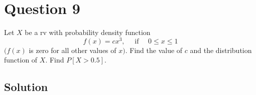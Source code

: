 \section*{Question 9}

Let \( X \) be a rv with probability density function
\begin{equation*}
    f(x)=c x^{3}, \quad \text { if } \quad 0 \leq x \leq 1
\end{equation*}
\( (f(x) \) is zero for all other values of \( x) \).
Find the value of \( c \) and the distribution function of \( X \).
Find \( P[X>0.5] \).

\subsection*{Solution}
